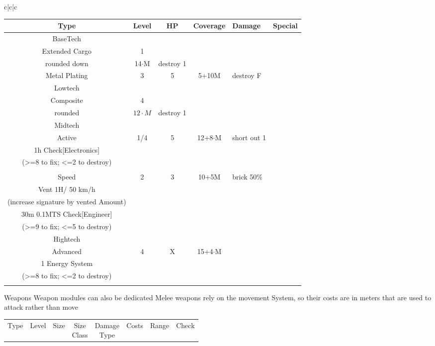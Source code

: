 \documentclass{article}
\begin{document}
\begin{tabular}{c|c|c}
    \begin{tabular}{c|cccll}
        Type & Level & HP & Coverage & Damage & Special\\
        \hline BaseTech&&&&&\\
        Extended Cargo & 1 & \makecell{\(\sqrt{M}\)\\ rounded down}& 14\(\cdot\)M & destroy 1 & \makecell[{{p{6cm}}}]{7 Cargo Spaces (Cargo is destroyed with the modules)}\\
        Metal Plating & 3 & 5 & 5+10M & destroy F & \makecell[{{p{6cm}}}]{counts twice towards movement system percentage} \\
        \hline Lowtech &&&&&\\
        Composite & 4 & \makecell[c]{\(2\cdot\sqrt{M}\)\\ rounded}& \(12\cdot M\) & destroy 1&\\
        \hline Midtech &&&&&\\
        Active & 1/4 & 5 & 12+8\(\cdot\)M & short out 1 & \makecell[{{p{6cm}}}]{ draws 10 Energy when hit \\
        1h Check[Electronics] \\(>=8 to fix; <=2 to destroy)}\\&\\
        Speed & 2 & 3 & 10+5M & brick 50\% & \makecell[{{p{6cm}}}]{1E/50km/h; \\Vent 1H/ 50 km/h \\
        (increase signature by vented Amount) \\30m 0.1MTS Check[Engineer]\\(>=9 to fix; <=5 to destroy)}\\
        \hline Hightech &&&&&\\
        Advanced & 4 & X & 15+4\(\cdot\)M & \makecell[l]{shorts out \\ 1 Energy System}&\makecell[{{p{6cm}}}]{
        1h Check[Electronics] \\(>=8 to fix; <=2 to destroy)}\\&\\
    \end{tabular}
    Weapons\newline
    Weapon modules can also be dedicated\newline
    Melee weapons rely on the movement System, so their costs are in meters that are used to attack rather than move\newline
    \begin{tabular}{c|cccclll}
        Type & Level & Size &\makecell{Size\\Class} & \makecell{Damage\\Type} & Costs & Range &Check\\

\end{tabular}
\end{tabular}
\end{document}
